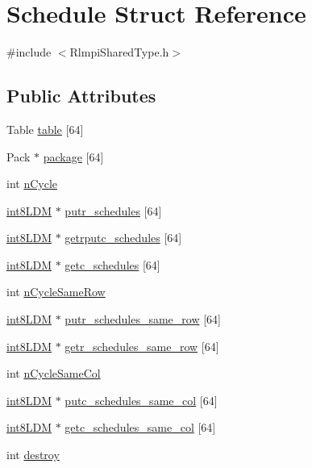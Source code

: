 \hypertarget{structSchedule}{
\section{Schedule Struct Reference}
\label{structSchedule}
}


{\ttfamily \#include $<$RlmpiSharedType.h$>$}\subsection*{Public Attributes}
\begin{DoxyCompactItemize}
\item 
Table \hyperlink{structSchedule_a6e17381062491d811869a301a45352fd}{table} \mbox{[}64\mbox{]}
\item 
Pack $\ast$ \hyperlink{structSchedule_a6db4fe79dba3c96ab9e2721ee44d5124}{package} \mbox{[}64\mbox{]}
\item 
int \hyperlink{structSchedule_aedc1bdf1c4fa45250d2b13d7aae41ed4}{nCycle}
\item 
\hyperlink{RlmpiSharedType_8h_a69782ffde89d45e86308f10afedf08a6}{int8LDM} $\ast$ \hyperlink{structSchedule_ab02d40d54d5146c7ed92e7f689b26fd7}{putr\_\-schedules} \mbox{[}64\mbox{]}
\item 
\hyperlink{RlmpiSharedType_8h_a69782ffde89d45e86308f10afedf08a6}{int8LDM} $\ast$ \hyperlink{structSchedule_a663d74ed3015c0ca66a39a4927d9a843}{getrputc\_\-schedules} \mbox{[}64\mbox{]}
\item 
\hyperlink{RlmpiSharedType_8h_a69782ffde89d45e86308f10afedf08a6}{int8LDM} $\ast$ \hyperlink{structSchedule_a9a2133b07eddab8481c2813822c21616}{getc\_\-schedules} \mbox{[}64\mbox{]}
\item 
int \hyperlink{structSchedule_aafb49c4ddb736e61cd99381077a2122a}{nCycleSameRow}
\item 
\hyperlink{RlmpiSharedType_8h_a69782ffde89d45e86308f10afedf08a6}{int8LDM} $\ast$ \hyperlink{structSchedule_a055c6e63ce07decd2b1b12c45ba567c3}{putr\_\-schedules\_\-same\_\-row} \mbox{[}64\mbox{]}
\item 
\hyperlink{RlmpiSharedType_8h_a69782ffde89d45e86308f10afedf08a6}{int8LDM} $\ast$ \hyperlink{structSchedule_ad7ae6c863963c88a05d5ea245c772752}{getr\_\-schedules\_\-same\_\-row} \mbox{[}64\mbox{]}
\item 
int \hyperlink{structSchedule_ab887894faf2b9bed0934452e1c2bf667}{nCycleSameCol}
\item 
\hyperlink{RlmpiSharedType_8h_a69782ffde89d45e86308f10afedf08a6}{int8LDM} $\ast$ \hyperlink{structSchedule_ae51ae34867cdecb96111f9a3d986b7a4}{putc\_\-schedules\_\-same\_\-col} \mbox{[}64\mbox{]}
\item 
\hyperlink{RlmpiSharedType_8h_a69782ffde89d45e86308f10afedf08a6}{int8LDM} $\ast$ \hyperlink{structSchedule_adb30896fefb80804c9cbfb3938f71e97}{getc\_\-schedules\_\-same\_\-col} \mbox{[}64\mbox{]}
\item 
int \hyperlink{structSchedule_ab2823b4aae65c91dc839a8ac5e221fe2}{destroy}
\end{DoxyCompactItemize}



